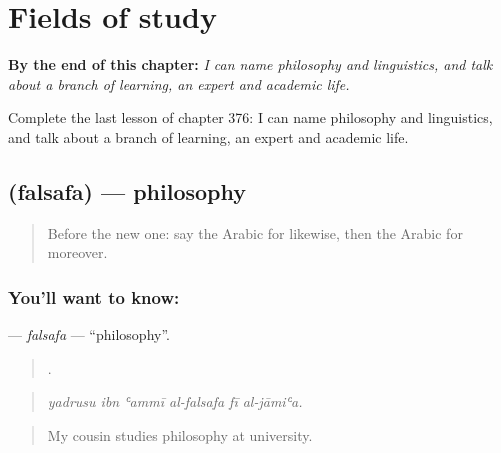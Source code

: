
\chapter{Fields of study}
\label{ch:ar-fields-of-study}

\begin{chapteropening}
\textbf{By the end of this chapter:} \emph{I can name philosophy and linguistics, and talk about a branch of learning, an expert and academic life.}

Complete the last lesson of chapter 376: I can name philosophy and linguistics, and talk about a branch of learning, an expert and academic life.
\end{chapteropening}

\section[\texorpdfstring{\ar{فلسفة} (falsafa)}{فلسفة (falsafa)}]{ (falsafa) — philosophy}

\label{lesson:AR-C376-falsafa}



\begin{quote}
Before the new one: say the Arabic for likewise, then the Arabic for moreover.
\end{quote}

\subsection*{You'll want to know: }
\textbf{} — \emph{falsafa} — \textquotedblleft{}philosophy\textquotedblright{}.

\begin{quote}
     .
\end{quote}

\begin{quote}
\emph{yadrusu ibn ʿammī al-falsafa fī al-jāmiʿa.}
\end{quote}

\begin{quote}
My cousin studies philosophy at university.
\end{quote}


